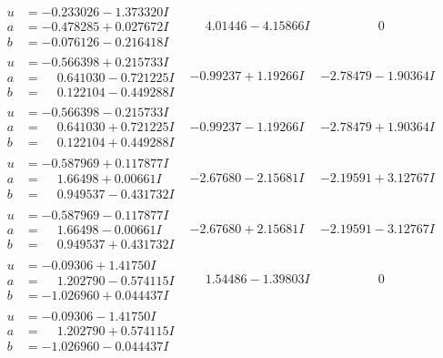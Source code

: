\documentclass[1p]{elsarticle_modified}
\theoremstyle{definition}
\begin{document}
$$\begin{array}{c|c|c}
 \hline 
\begin{aligned}
u &= -0.233026 - 1.373320 I \\
a &= -0.478285 + 0.027672 I \\
b &= -0.076126 - 0.216418 I\end{aligned}
 & \phantom{-}4.01446 - 4.15866 I & \phantom{-0.000000 } 0 \\ \hline\begin{aligned}
u &= -0.566398 + 0.215733 I \\
a &= \phantom{-}0.641030 - 0.721225 I \\
b &= \phantom{-}0.122104 - 0.449288 I\end{aligned}
 & -0.99237 + 1.19266 I & -2.78479 - 1.90364 I \\ \hline\begin{aligned}
u &= -0.566398 - 0.215733 I \\
a &= \phantom{-}0.641030 + 0.721225 I \\
b &= \phantom{-}0.122104 + 0.449288 I\end{aligned}
 & -0.99237 - 1.19266 I & -2.78479 + 1.90364 I \\ \hline\begin{aligned}
u &= -0.587969 + 0.117877 I \\
a &= \phantom{-}1.66498 + 0.00661 I \\
b &= \phantom{-}0.949537 - 0.431732 I\end{aligned}
 & -2.67680 - 2.15681 I & -2.19591 + 3.12767 I \\ \hline\begin{aligned}
u &= -0.587969 - 0.117877 I \\
a &= \phantom{-}1.66498 - 0.00661 I \\
b &= \phantom{-}0.949537 + 0.431732 I\end{aligned}
 & -2.67680 + 2.15681 I & -2.19591 - 3.12767 I \\ \hline\begin{aligned}
u &= -0.09306 + 1.41750 I \\
a &= \phantom{-}1.202790 - 0.574115 I \\
b &= -1.026960 + 0.044437 I\end{aligned}
 & \phantom{-}1.54486 - 1.39803 I & \phantom{-0.000000 } 0 \\ \hline\begin{aligned}
u &= -0.09306 - 1.41750 I \\
a &= \phantom{-}1.202790 + 0.574115 I \\
b &= -1.026960 - 0.044437 I\end{aligned}

\end{array}$$
\end{document}
